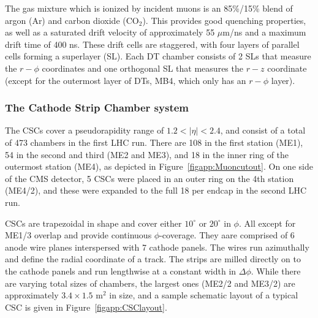 The gas mixture which is ionized by incident muons is an 85\%/15\% blend of argon (Ar) and carbon dioxide (CO$_2$).  This provides good quenching properties, as well as a saturated drift velocity of approximately 55 $\mu$m/ns and a maximum drift time of 400 ns.  These drift cells are staggered, with four layers of parallel cells forming a superlayer (SL).  Each DT chamber consists of 2 SLs that measure the $r-\phi$ coordinates and one orthogonal SL that measures the $r-z$ coordinate (except for the outermost layer of DTs, MB4, which only has an $r-\phi$ layer).  



\subsubsection{The Cathode Strip Chamber system}
\label{cscs}



The CSCs cover a pseudorapidity range of $1.2 < |\eta| < 2.4$, and consist of a total of 473 chambers in the first LHC run.  There are 108 in the first station (ME1), 54 in the second and third (ME2 and ME3), and 18 in the inner ring of the outermost station (ME4), as depicted in Figure~\ref{figapp:Muoncutout}.  On one side of the CMS detector, 5 CSCs were placed in an outer ring on the 4th station (ME4/2), and these were expanded to the full 18 per endcap in the second LHC run.  

CSCs are trapezoidal in shape and cover either $10^\circ$ or $20^\circ$ in $\phi$.  All except for ME1/3 overlap and provide continuous $\phi$-coverage.  They aare comprised of 6 anode wire planes interspersed with 7 cathode panels.  The wires run azimuthally and define the radial coordinate of a track.  The strips are milled directly on to the cathode panels and run lengthwise at a constant width in $\Delta\phi$.  While there are varying total sizes of chambers, the largest ones (ME2/2 and ME3/2) are approximately $3.4 \times 1.5 \text{ m}^2$ in size, and a sample schematic layout of a typical CSC is given in Figure~\ref{figapp:CSClayout}.




